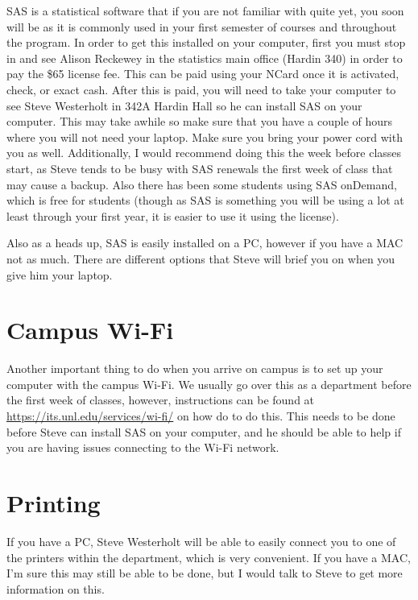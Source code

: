 \documentclass[
  12pt,
]{book}
\begin{document}
SAS is a statistical software that if you are not familiar with quite yet, you soon will be as it is commonly used in your first semester of courses and throughout the program. In order to get this installed on your computer, first you must stop in and see Alison Reckewey in the statistics main office (Hardin 340) in order to pay the \$65 license fee. This can be paid using your NCard once it is activated, check, or exact cash. After this is paid, you will need to take your computer to see Steve Westerholt in 342A Hardin Hall so he can install SAS on your computer. This may take awhile so make sure that you have a couple of hours where you will not need your laptop. Make sure you bring your power cord with you as well. Additionally, I would recommend doing this the week before classes start, as Steve tends to be busy with SAS renewals the first week of class that may cause a backup. Also there has been some students using SAS onDemand, which is free for students (though as SAS is something you will be using a lot at least through your first year, it is easier to use it using the license).

Also as a heads up, SAS is easily installed on a PC, however if you have a MAC not as much. There are different options that Steve will brief you on when you give him your laptop.

\hypertarget{campus-wi-fi}{%
\section{Campus Wi-Fi}\label{campus-wi-fi}}

Another important thing to do when you arrive on campus is to set up your computer with the campus Wi-Fi. We usually go over this as a department before the first week of classes, however, instructions can be found at \url{https://its.unl.edu/services/wi-fi/} on how do to do this. This needs to be done before Steve can install SAS on your computer, and he should be able to help if you are having issues connecting to the Wi-Fi network.

\hypertarget{printing}{%
\section{Printing}\label{printing}}

If you have a PC, Steve Westerholt will be able to easily connect you to one of the printers within the department, which is very convenient. If you have a MAC, I'm sure this may still be able to be done, but I would talk to Steve to get more information on this.
\end{document}
